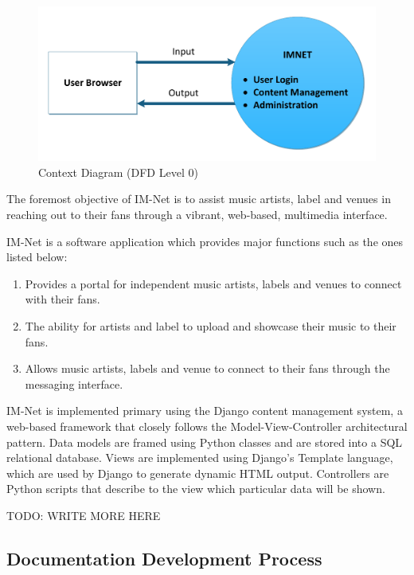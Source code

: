 \documentclass[letterpaper,12pt]{article}
\begin{document}
{%
\begin{figure}[h]
\centering
\includegraphics[scale=0.9]{DFD_level_0.pdf}
\caption{Context Diagram (DFD Level 0)}
\label{fig:DFD_level_0}
\end{figure}

The foremost objective of IM-Net is to assist music artists, label and venues in reaching out to their fans through a vibrant, web-based, multimedia interface.

IM-Net is a software application which provides major functions such as the ones listed below:

\begin{enumerate}
\item  Provides a portal for independent music artists, labels and venues to connect with their fans.

\item  The ability for artists and label to upload and showcase their music to their fans.

\item  Allows music artists, labels and venue to connect to their fans through the messaging interface.
\end{enumerate}

IM-Net is implemented primary using the Django content management system, a web-based framework that closely follows the Model-View-Controller architectural pattern. Data models are framed using Python classes and are stored into a SQL relational database. Views are implemented using Django's Template language, which are used by Django to generate dynamic HTML output. Controllers are Python scripts that describe to the view which particular data will be shown. 

TODO: WRITE MORE HERE

\textcolor{subsection}{\subsection{Documentation Development Process}}

}
\end{document}
